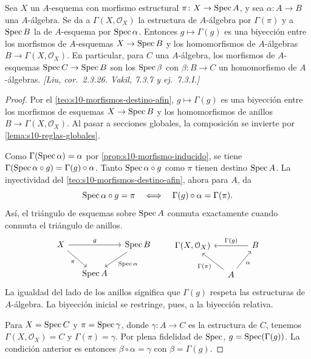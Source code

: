 \begin{lema}
\label{lema:s10-morfismos-a-esquemas}
Sea \(X\) un \(A\)-esquema con morfismo estructural \(\pi\colon X\to\operatorname{Spec} A\), y sea \(\alpha\colon A\to B\) una \(A\)-álgebra. Se da a \(\Gamma(X,\mathcal O_X)\) la estructura de \(A\)-álgebra por \(\Gamma(\pi)\) y a \(\operatorname{Spec} B\) la de \(A\)-esquema por \(\operatorname{Spec}\alpha\). Entonces \(g\mapsto\Gamma(g)\) es una biyección entre los morfismos de \(A\)-esquemas \(X\to\operatorname{Spec} B\) y los homomorfismos de \(A\)-álgebras \(B\to\Gamma(X,\mathcal O_X)\). En particular, para \(C\) una \(A\)-álgebra, los morfismos de \(A\)-esquemas \(\operatorname{Spec} C\to\operatorname{Spec} B\) son los \(\operatorname{Spec}\beta\) con \(\beta\colon B\to C\) un homomorfismo de \(A\)-álgebras. \emph{[Liu, cor.~2.3.26. Vakil, 7.3.7 y ej.~7.3.I.]}
\end{lema}
\begin{proof}
Por el \cref{teo:s10-morfismos-destino-afin}, \(g\mapsto\Gamma(g)\) es una biyección entre los morfismos de esquemas \(X\to\operatorname{Spec} B\) y los homomorfismos de anillos \(B\to\Gamma(X,\mathcal O_X)\). Al pasar a secciones globales, la composición se invierte por \cref{lema:s10-reglas-globales}.

Como \(\Gamma(\operatorname{Spec}\alpha)=\alpha\) por \cref{prop:s10-morfismo-inducido}, se tiene \(\Gamma(\operatorname{Spec}\alpha\circ g)=\Gamma(g)\circ\alpha\). Tanto \(\operatorname{Spec}\alpha\circ g\) como \(\pi\) tienen destino \(\operatorname{Spec} A\). La inyectividad del \cref{teo:s10-morfismos-destino-afin}, ahora para \(A\), da
\[
 \operatorname{Spec}\alpha\circ g=\pi \quad\Longleftrightarrow\quad
 \Gamma(g)\circ\alpha=\Gamma(\pi).
\]
Así, el triángulo de esquemas sobre \(\operatorname{Spec} A\) conmuta exactamente cuando conmuta el triángulo de anillos.
\[
\begin{tikzcd}[column sep=small]
 X \arrow[rr,"g"] \arrow[dr,"\pi"'] && \Spec B \arrow[dl,"\Spec\alpha"] \\
 & \Spec A &
\end{tikzcd}
\qquad
\begin{tikzcd}[column sep=small]
 \Gamma(X,\mathcal O_X) && B \arrow[ll,"\Gamma(g)"'] \\
 & A \arrow[ul,"\Gamma(\pi)"] \arrow[ur,"\alpha"'] &
\end{tikzcd}
\]
La igualdad del lado de los anillos significa que \(\Gamma(g)\) respeta las estructuras de \(A\)-álgebra. La biyección inicial se restringe, pues, a la biyección relativa.

Para \(X=\operatorname{Spec} C\) y \(\pi=\operatorname{Spec}\gamma\), donde \(\gamma\colon A\to C\) es la estructura de \(C\), tenemos \(\Gamma(X,\mathcal O_X)=C\) y \(\Gamma(\pi)=\gamma\). Por plena fidelidad de \(\operatorname{Spec}\), \(g=\operatorname{Spec}(\Gamma(g))\). La condición anterior es entonces \(\beta\circ\alpha=\gamma\) con \(\beta=\Gamma(g)\).
\end{proof}

